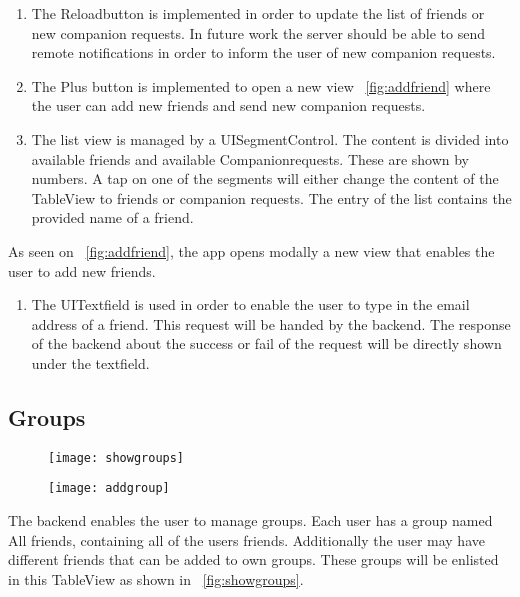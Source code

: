 \begin{enumerate}
\item The Reloadbutton is implemented in order to update the list of friends or new companion requests. In future work the server should be able to send remote notifications in order to inform the user of new companion requests.

\item The Plus button is implemented to open a new view ~\ref{fig:addfriend} where the user can add new friends and send new companion requests.

\item The list view is managed by a UISegmentControl. The content is divided into available friends and available Companionrequests. These are shown by numbers. A tap on one of the segments will either change the content of the TableView to friends or companion requests. The entry of the list contains the provided name of a friend.
\end{enumerate}


As seen on ~\ref{fig:addfriend}, the app opens modally a new view that enables the user to add new friends.

\begin{enumerate}
\item The UITextfield is used in order to enable the user to type in the email address of a friend. This request will be handed by the backend. The response of the backend about the success or fail of the request will be directly shown under the textfield.
\end{enumerate}

\subsection{Groups}

\begin{figure}
\centering
\begin{minipage}{.5\textwidth}
  \centering
  \texttt{[image: showgroups]}
  \label{fig:showgroups}
\end{minipage}%
\begin{minipage}{.5\textwidth}
  \centering
  \texttt{[image: addgroup]}
  \label{fig:addgroup}
\end{minipage}
\end{figure}

The backend enables the user to manage groups. Each user has a group named All friends, containing all of the users friends. Additionally the user may have different friends that can be added to own groups. These groups will be enlisted in this TableView as shown in ~\ref{fig:showgroups}. 


